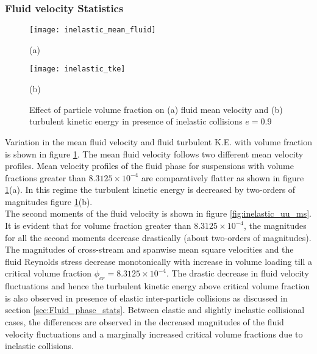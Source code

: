 \documentclass[aip,graphicx]{revtex4-1}
\begin{document}
\subsubsection{\textbf{Fluid velocity Statistics}}
    \begin{figure}[h!]
        	\texttt{[image: inelastic\_mean\_fluid]}
    	\caption*{(a)}
  	\texttt{[image: inelastic\_tke]}
  	\caption*{(b)}
  	\caption{Effect of particle volume fraction on (a) fluid mean velocity and (b) turbulent kinetic energy in presence of inelastic collisions $e=0.9$}
  	\label{fig:inelastic_mean_tke}
    \end{figure}
  Variation in the mean fluid velocity and fluid turbulent K.E. with volume fraction is shown in figure \ref{fig:inelastic_mean_tke}. The mean fluid velocity follows two different mean velocity profiles. \textcolor{black}{Mean velocity profiles of the} fluid phase for suspensions with volume fractions greater than $8.3125\times10^{-4}$ \textcolor{black}{are} comparatively flatter \textcolor{black}{as shown in} figure \ref{fig:inelastic_mean_tke}(a). In this regime the turbulent kinetic energy is decreased by two-orders of magnitudes figure \ref{fig:inelastic_mean_tke}(b).
  \\ The second moments of the fluid velocity is shown in figure \ref{fig:inelastic_uu_ms}. It is evident that for volume fraction greater than $8.3125\times10^{-4}$, the magnitudes for all the second moments decrease drastically (about two-orders of magnitudes). The magnitudes of cross-stream and spanwise mean square velocities and the fluid Reynolds stress decrease monotonically with increase in volume loading till a critical volume fraction $\phi_{cr}=8.3125\times10^{-4}$. The drastic decrease in fluid velocity fluctuations and hence the turbulent kinetic energy above critical volume fraction is also observed in presence of elastic inter-particle collisions as discussed in section \ref{sec:Fluid_phase_stats}.  
  Between elastic and slightly inelastic collisional cases, the differences are observed in the decreased magnitudes of the fluid velocity fluctuations and a marginally increased critical volume fractions due to inelastic collisions. 
\end{document}
